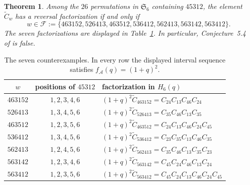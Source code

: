 \documentclass[10pt]{amsart}
\newtheorem{theorem}{Theorem}
\theoremstyle{remark}
\newcommand{\Ssix}{\mathfrak S_6}
\newcommand{\Ct}{\widetilde C}
\newcommand{\Cab}[2]{C_{#1#2}}
\begin{document}
\begin{theorem}\label{thm:main}
Among the $26$ permutations in $\Ssix$ containing $45312$, the element
$\Ct_w$ has a reversal factorization if and only if
\[
w\in\mathcal F:=
\{463152,526413,463512,536412,562413,563142,563412\}.
\]
The seven factorizations are displayed in
Table~\ref{tab:factorizations}. In particular, Conjecture~5.4 of
\cite{ParisiEtAl} is false.
\end{theorem}

\begin{table}[t]
\centering
\small
\caption{The seven counterexamples. In every row the displayed
interval sequence satisfies $f_{\mathcal A}(q)=(1+q)^2$.}
\label{tab:factorizations}
\begin{tabular}{@{}ccl@{}}
\toprule
$w$ & positions of $45312$ & factorization in $H_6(q)$ \\
\midrule
$463152$ & $1,2,3,4,6$ &
$(1+q)^2\Ct_{463152}=\Cab{2}{4}\Cab{1}{3}\Cab{4}{6}\Cab{2}{4}$ \\
$526413$ & $1,3,4,5,6$ &
$(1+q)^2\Ct_{526413}=\Cab{3}{5}\Cab{4}{6}\Cab{1}{3}\Cab{3}{5}$ \\
$463512$ & $1,2,3,5,6$ &
$(1+q)^2\Ct_{463512}=\Cab{2}{4}\Cab{1}{3}\Cab{4}{6}\Cab{2}{4}\Cab{4}{5}$ \\
$536412$ & $1,3,4,5,6$ &
$(1+q)^2\Ct_{536412}=\Cab{2}{3}\Cab{3}{5}\Cab{1}{3}\Cab{4}{6}\Cab{3}{5}$ \\
$562413$ & $1,2,4,5,6$ &
$(1+q)^2\Ct_{562413}=\Cab{3}{5}\Cab{4}{6}\Cab{1}{3}\Cab{3}{5}\Cab{2}{3}$ \\
$563142$ & $1,2,3,4,6$ &
$(1+q)^2\Ct_{563142}=\Cab{4}{5}\Cab{2}{4}\Cab{4}{6}\Cab{1}{3}\Cab{2}{4}$ \\
$563412$ & $1,2,3,5,6$ &
$(1+q)^2\Ct_{563412}=\Cab{4}{5}\Cab{2}{4}\Cab{1}{3}\Cab{4}{6}\Cab{2}{4}\Cab{4}{5}$ \\
\bottomrule
\end{tabular}
\end{table}
\end{document}
